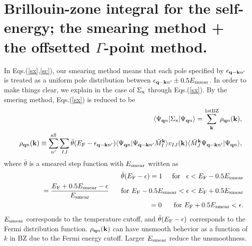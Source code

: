 \documentclass[a4paper,10pt,epsf,fleqn]{article}
\begin{document}
\section{Brillouin-zone integral for the self-energy; 
the smearing method + the offsetted $\Gamma$-point method.}
\label{kint}
     In Eqs.(\ref{sx},\ref{sc}), our smearing method means that 
each pole specified by $\epsilon_{{\bf q}-{\bf k} n'}$ is
treated as a uniform pole distribution
between $\epsilon_{{\bf q}-{\bf k} n'} \pm 0.5 E_{\rm smear}$.
In order to make things clear,
we explain in the case of $\Sigma_{\rm x}$ through Eqs.(\ref{sx}).
By the smering method,  Eqs.(\ref{sx}) is reduced to be
\setlength{\mathindent}{-8mm}
\begin{eqnarray}
&&\langle \Psi_{{\bf q}n}|\Sigma_{\rm x} |\Psi_{{\bf q}n} \rangle
= \sum_{\bf k}^{\rm 1st BZ} \rho_{{\bf q}n}({\bf k}), \label{sxqn}\\
&&\rho_{{\bf q}n}({\bf k}) \equiv \sum^{\rm  all}_{n'} \sum_{IJ}
\bar{\theta}(E_{\rm F}-\epsilon_{{\bf q- k} n'})
\langle \Psi_{{\bf q}n}| \Psi_{{\bf q-k}n'} \tilde{M}^{\bf k}_I \rangle v_{IJ}({\bf k})
\langle \tilde{M}^{\bf k}_J \Psi_{{\bf q-k}n'} | \Psi_{{\bf q}n} \rangle,
\label{sxsmear2}
\end{eqnarray}
where $\bar{\theta}$ is a smeared step function with $E_{\rm smear}$ written as
\setlength{\mathindent}{-5mm}
\begin{eqnarray}
&&\bar{\theta}(E_{\rm F}-\epsilon) = 1 \hspace{.5cm} {\rm for} \hspace{.3cm} \epsilon < E_{\rm F} - 0.5 E_{\rm smear} \nonumber \\
&&\hspace{1.3cm}= \frac{E_{\rm F} + 0.5 E_{\rm smear} -\epsilon}{E_{\rm smear}}  \hspace{.5cm}
{\rm \ for \ }  E_{\rm F} - 0.5 E_{\rm smear}<\epsilon<E_{\rm F} + 0.5 E_{\rm smear} \nonumber \\
&&\hspace{1.3cm}=0 \hspace{.5cm} {\rm \ for \ } E_{\rm F}+0.5 E_{\rm smear}<\epsilon.
\end{eqnarray}
\setlength{\mathindent}{0mm}
$E_{\rm smear}$ corresponds to the temperature cutoff, and $\bar{\theta}(E_{\rm F}-\epsilon)$
corresponds to the Fermi distribution function.
$\rho_{{\bf q}n}({\bf k})$ can have unsmooth behevior as a function of $k$ 
in BZ due to the Fermi energy cutoff. 
Larger $E_{\rm smear}$ reduce the unsmoothness.
\end{document}
